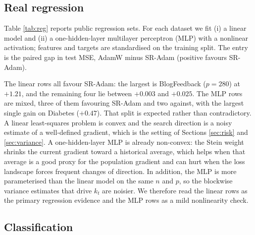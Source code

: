 \documentclass[a4paper,fleqn]{cas-sc}
\theoremstyle{plain}
\theoremstyle{definition}
\theoremstyle{remark}
\begin{document}
\subsection{Real regression}

Table \ref{tab:reg} reports public regression sets. For each dataset we fit (i) a linear model and (ii) a one-hidden-layer multilayer perceptron (MLP) with a nonlinear activation; features and targets are standardised on the training split. The entry is the paired gap in test MSE, AdamW minus SR-Adam (positive favours SR-Adam).

The linear rows all favour SR-Adam: the largest is BlogFeedback ($p=280$) at $+1.21$, and the remaining four lie between $+0.003$ and $+0.025$. The MLP rows are mixed, three of them favouring SR-Adam and two against, with the largest single gain on Diabetes ($+0.47$). That split is expected rather than contradictory. A linear least-squares problem is convex and the search direction is a noisy estimate of a well-defined gradient, which is the setting of Sections \ref{sec:risk} and \ref{sec:variance}. A one-hidden-layer MLP is already non-convex: the Stein weight shrinks the current gradient toward a historical average, which helps when that average is a good proxy for the population gradient and can hurt when the loss landscape forces frequent changes of direction. In addition, the MLP is more parameterised than the linear model on the same $n$ and $p$, so the blockwise variance estimates that drive $k_t$ are noisier. We therefore read the linear rows as the primary regression evidence and the MLP rows as a mild nonlinearity check.

\begin{table}%
\centering
\caption{Regression on public tabular sets. Gap in test MSE, AdamW minus SR-Adam; bold positive entries favour SR-Adam. \emph{Model} is either a linear regressor or a one-hidden-layer MLP (nonlinear).}
\label{tab:reg}

\end{table}

\subsection{Classification}
\end{document}
